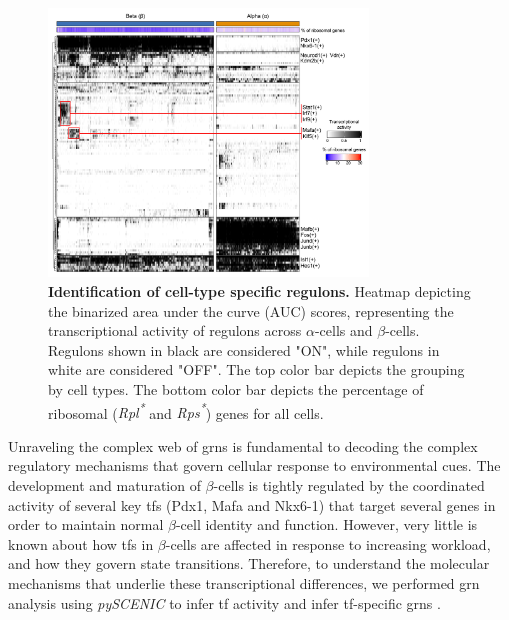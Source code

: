 \begin{figure}
\vspace{-30pt}
\includegraphics[width=8.5cm]{Chapter5/Fig/F3-11-01.png}
\caption[Identification of cell-type specific regulons]{\textbf{Identification of cell-type specific regulons.} Heatmap depicting the binarized area under the curve (AUC) scores, representing the transcriptional activity of regulons across $\alpha$-cells and $\beta$-cells. Regulons shown in black are considered "ON", while regulons in white are considered "OFF". The top color bar depicts the grouping by cell types. The bottom color bar depicts the percentage of ribosomal (\textit{Rpl\textsuperscript{*}} and \textit{Rps\textsuperscript{*}}) genes for all cells.}
\vspace{-40pt}
\label{fig:chp3_scenic_alphabeta}
\end{figure}

Unraveling the complex web of \glspl{grn} is fundamental to decoding the complex regulatory mechanisms that govern cellular response to environmental cues. The development and maturation of $\beta$-cells is tightly regulated by the coordinated activity of several key \glspl{tf} (Pdx1, Mafa and Nkx6-1) that target several genes in order to maintain normal $\beta$-cell identity and function. However, very little is known about how \glspl{tf} in $\beta$-cells are affected in response to increasing workload, and how they govern state transitions. Therefore, to understand the molecular mechanisms that underlie these transcriptional differences, we performed \gls{grn} analysis using \textit{pySCENIC} to infer \gls{tf} activity and infer \gls{tf}-specific \glspl{grn} \textbf{\cite{kumar_inference_2021}}.\\

